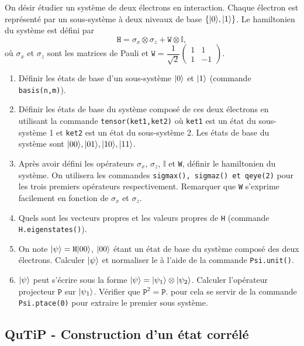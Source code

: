 On désir étudier un système de deux électrons en interaction. Chaque électron est représenté par un sous-système à deux niveaux de base $\{\vert0\rangle,\vert1\rangle\}$. Le hamiltonien du système est défini par
\begin{equation}
\mathtt{H} = \sigma_x\otimes\sigma_z+\mathtt{W}\otimes\mathbb{I},
\end{equation}
où $\sigma_x$ et $\sigma_z$ sont les matrices de Pauli et $\mathtt{W}=\dfrac{1}{\sqrt{2}}\begin{pmatrix}1 & 1 \\ 1 & -1 \end{pmatrix}$.
\begin{enumerate}
\item Définir les états de base d'un sous-système $\vert0\rangle$ et $\vert1\rangle$ (commande \texttt{basis(n,m)}).

\item Définir les états de base du système composé de ces deux électrons en utilisant la commande \texttt{tensor(ket1,ket2)} où \texttt{ket1} est un état du sous-système 1 et \texttt{ket2} est un état du sous-système 2. Les états de base du système sont $\vert00\rangle, \vert01\rangle, \vert10\rangle, \vert11\rangle$.

\item Après avoir défini les opérateurs $\sigma_x$, $\sigma_z$, $\mathbb{I}$ et \texttt{W}, définir le hamiltonien du système. On utilisera les commandes \texttt{sigmax(), sigmaz() et qeye(2)} pour les trois premiers opérateurs respectivement. Remarquer que \texttt{W} s'exprime facilement en fonction de $\sigma_x$ et $\sigma_z$.

\item Quels sont les vecteurs propres et les valeurs propres de \texttt{H} (commande \texttt{H.eigenstates()}).

\item On note $\vert\psi\rangle=\mathtt{H}\vert00\rangle$, $\vert00\rangle$ étant un état de base du système composé des deux électrons. Calculer $\vert\psi\rangle$ et normaliser le à l'aide de la commande \texttt{Psi.unit()}.

\item  $\vert\psi\rangle$ peut s'écrire sous la forme $\vert\psi\rangle=\vert\psi_1\rangle\otimes\vert\psi_2\rangle$. Calculer l'opérateur projecteur $\mathtt{P}$ sur $\vert\psi_1\rangle$. Vérifier que $\mathtt{P}^2=\mathtt{P}$. pour cela se servir de la commande \texttt{Psi.ptace(0)} pour extraire le premier sous système.
\end{enumerate}

\subsection{QuTiP - Construction d'un état corrélé}

